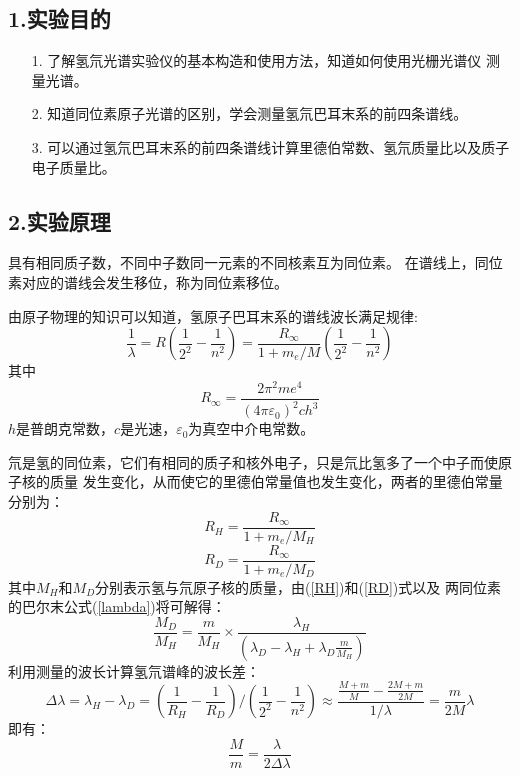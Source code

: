 \documentclass[utf8]{ctexart}
\begin{document}
	\subsection*{1.实验目的}	
    \begin{itemize}
        \item [1.] 了解氢氘光谱实验仪的基本构造和使用方法，知道如何使用光栅光谱仪
        测量光谱。
        \item [2.] 知道同位素原子光谱的区别，学会测量氢氘巴耳末系的前四条谱线。
        \item [3.] 可以通过氢氘巴耳末系的前四条谱线计算里德伯常数、氢氘质量比以及质子电子质量比。
    \end{itemize}
	\subsection*{2.实验原理} 
	具有相同质子数，不同中子数同一元素的不同核素互为同位素。
    在谱线上，同位素对应的谱线会发生移位，称为同位素移位。

    由原子物理的知识可以知道，氢原子巴耳末系的谱线波长满足规律:
    \begin{equation} \label{lambda}
        \frac{1}{\lambda} = R\left(\frac{1}{2^2}-\frac{1}{n^2}\right) = \frac{R_{\infty}}{1+m_e/M}\left(\frac{1}{2^2}-\frac{1}{n^2}\right)
    \end{equation}
    其中
    \begin{equation}
        R_{\infty} = \frac{2\pi^2me^4}{(4\pi\varepsilon_0)^2ch^3}
    \end{equation}
    $h$是普朗克常数，$c$是光速，$\varepsilon_0$为真空中介电常数。

    氘是氢的同位素，它们有相同的质子和核外电子，只是氘比氢多了一个中子而使原子核的质量
    发生变化，从而使它的里德伯常量值也发生变化，两者的里德伯常量分别为：
    \begin{equation} \label{RH}
        R_H = \frac{R_\infty}{1+m_e/M_H}
    \end{equation}
    \begin{equation} \label{RD}
        R_D = \frac{R_\infty}{1+m_e/M_D}
    \end{equation}
    其中$M_H$和$M_D$分别表示氢与氘原子核的质量，由(\ref{RH})和(\ref{RD})式以及
    两同位素的巴尔末公式(\ref{lambda})将可解得：
    \begin{equation}
        \frac{M_D}{M_H} = \frac{m}{M_H}\times\frac{\lambda_H}{(\lambda_D-\lambda_H+\lambda_D\frac{m}{M_H})}
    \end{equation}
    利用测量的波长计算氢氘谱峰的波长差：
    \begin{equation}
            \Delta\lambda = \lambda_H-\lambda_D = \left( \frac{1}{R_H} - \frac{1}{R_D} \right)
            \bigg/\left( \frac{1}{2^2} - \frac{1}{n^2} \right) \approx 
            \frac{\frac{M+m}{M}-\frac{2M+m}{2M}}{1/\lambda}=\frac{m}{2M}\lambda
    \end{equation}
    即有：
    \begin{equation}
        \frac{M}{m} = \frac{\lambda}{2\Delta\lambda}
    \end{equation}
\end{document}
